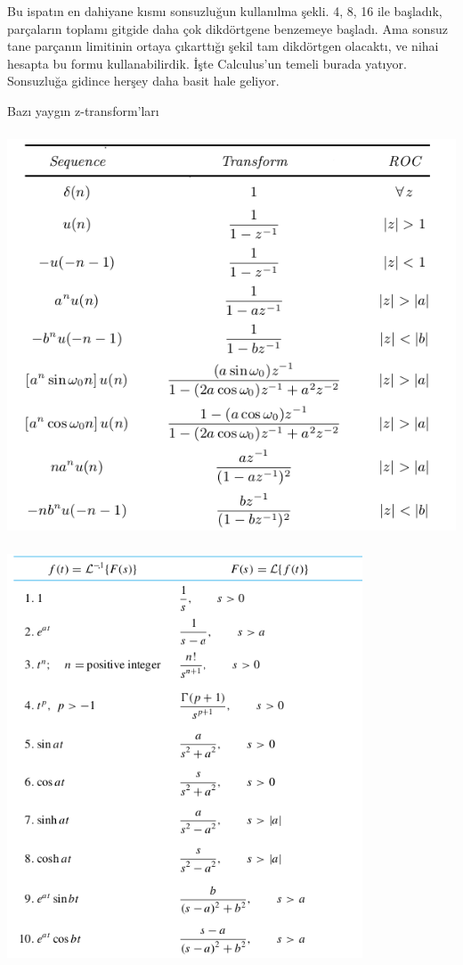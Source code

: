 \documentclass[12pt,fleqn]{article}\usepackage{../../common}
\begin{document}
Bu ispatın en dahiyane kısmı sonsuzluğun kullanılma şekli. 4, 8, 16 ile
başladık, parçaların toplamı gitgide daha çok dikdörtgene benzemeye
başladı. Ama sonsuz tane parçanın limitinin ortaya çıkarttığı şekil tam
dikdörtgen olacaktı, ve nihai hesapta bu formu kullanabilirdik. İşte
Calculus'un temeli burada yatıyor. Sonsuzluğa gidince herşey daha basit
hale geliyor.


\newpage

Bazı yaygın z-transform'ları 

\includegraphics[height=12cm]{z_01.png}

\includegraphics[height=12cm]{lap_1.png}
\end{document}
